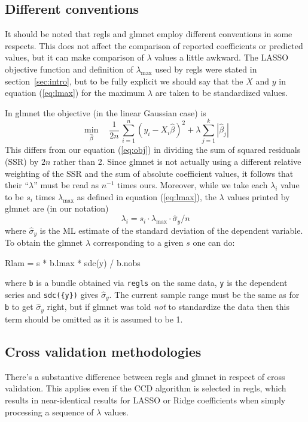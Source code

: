 \documentclass{article}
\begin{document}
\subsection*{Different conventions}

It should be noted that \textsf{regls} and \textsf{glmnet} employ
different conventions in some respects. This does not affect the
comparison of reported coefficients or predicted values, but it can
make comparison of $\lambda$ values a little awkward. The LASSO
objective function and definition of $\lambda_{\max}$ used by
\textsf{regls} were stated in section~\ref{sec:intro}, but to be fully
explicit we should say that the $X$ and $y$ in equation
(\ref{eq:lmax}) for the maximum $\lambda$ are taken to be standardized
values.

In \textsf{glmnet} the objective (in the linear Gaussian case) is
\[
   \min_{\hat{\beta}} \quad \frac{1}{2n}\,
  \sum_{i=1}^n (y_i - X_i\hat{\beta})^2 + \lambda \sum_{j=1}^k |\hat{\beta}_j|
\]
This differs from our equation (\ref{eq:obj}) in dividing the sum of
squared residuals (SSR) by $2n$ rather than 2. Since \textsf{glmnet}
is not actually using a different relative weighting of the SSR and
the sum of absolute coefficient values, it follows that their
``$\lambda$'' must be read as $n^{-1}$ times ours. Moreover, while we
take each $\lambda_i$ value to be $s_i$ times $\lambda_{\max}$ as
defined in equation (\ref{eq:lmax}), the $\lambda$ values printed by
\textsf{glmnet} are (in our notation)
\[
\lambda_i = s_i \cdot \lambda_{\max} \cdot \hat{\sigma}_y / n
\]
where $\hat{\sigma}_y$ is the ML estimate of the standard deviation of
the dependent variable. To obtain the \textsf{glmnet} $\lambda$
corresponding to a given $s$ one can do:
\begin{code}
Rlam = s * b.lmax * sdc({y}) / b.nobs
\end{code}
where \texttt{b} is a bundle obtained via \texttt{regls} on the same
data, \texttt{y} is the dependent series and \texttt{sdc(\{y\})} gives
$\hat{\sigma}_y$. The current sample range must be the same as for
\texttt{b} to get $\hat{\sigma}_y$ right, but if \textsf{glmnet} was
told \textit{not} to standardize the data then this term should be
omitted as it is assumed to be 1.

\subsection*{Cross validation methodologies}

There's a substantive difference between \textsf{regls} and
\textsf{glmnet} in respect of cross validation. This applies even if
the CCD algorithm is selected in \textsf{regls}, which results in
near-identical results for LASSO or Ridge coefficients when simply
processing a sequence of $\lambda$ values.
\end{document}
